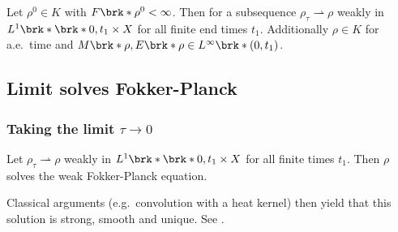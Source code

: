 \begin{frame}
  \begin{corollary}
    Let $\rho^0\in K$ with $F\brk*{\rho^0}<\infty$.
    Then for a subsequence $\rho_\tau\rightharpoonup\rho$ weakly in $L^1\brk*{\brk*{0,t_1}\times X}$ for all finite end times $t_1$.
    Additionally $\rho\in K$ for a.e.\ time and $M\brk*{\rho},E\brk*{\rho}\in L^\infty\brk*{(0,t_1)}$.
  \end{corollary}
\end{frame}



\subsection{Limit solves Fokker-Planck}

\begin{frame}
  \frametitle{Taking the limit $\tau\to0$}
  \begin{proposition}
    Let $\rho_\tau\rightharpoonup \rho$ weakly in $L^1\brk*{\brk*{0,t_1}\times X}$ for all finite times $t_1$.
    Then $\rho$ solves the weak Fokker-Planck equation. 
  \end{proposition}
  Classical arguments (e.g.\ convolution with a heat kernel)
  then yield that this solution is strong, smooth and unique.
  See \cite[Theorem 5.1]{Otto1998}.
\end{frame}


